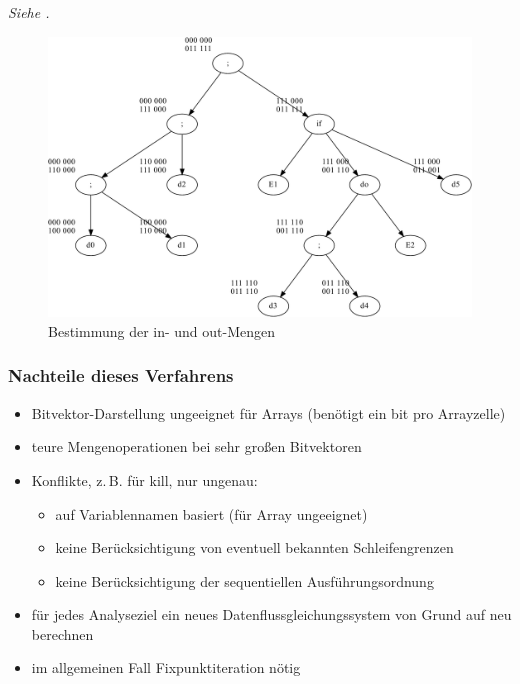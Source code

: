 \textit{Siehe .}
\begin{figure}[p]
    \centering
    \includegraphics[scale=0.4]{images/convent-inout.pdf}
    \caption{Bestimmung der in- und out-Mengen}
    \label{convent:inout}
\end{figure}

\subsubsection{Nachteile dieses Verfahrens}
\label{ssub:nachteile_dieses_verfahrens}

\begin{itemize}
  \item Bitvektor-Darstellung ungeeignet für Arrays (benötigt ein bit pro Arrayzelle)
  \item teure Mengenoperationen bei sehr großen Bitvektoren
  \item Konflikte, z.\,B. für kill, nur ungenau:
    \begin{itemize}
    \item auf Variablennamen basiert (für Array ungeeignet)
    \item keine Berücksichtigung von eventuell bekannten Schleifengrenzen
    \item keine Berücksichtigung der sequentiellen Ausführungsordnung
    \end{itemize}
  \item für jedes Analyseziel ein neues Datenflussgleichungssystem von Grund auf neu berechnen
  \item im allgemeinen Fall Fixpunktiteration nötig
\end{itemize}

